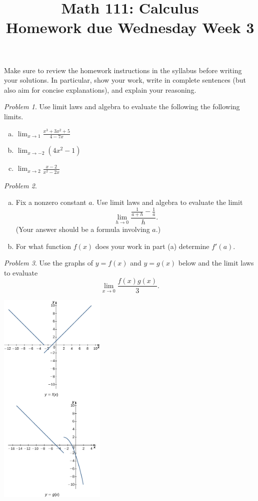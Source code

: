 \documentclass[11pt,twoside]{amsart}
\title{Math 111: Calculus\\ Homework due Wednesday Week 3}
\theoremstyle{plain}
\theoremstyle{remark}
\newtheorem{prob}{Problem}
\theoremstyle{definition}
\theoremstyle{definition}
\begin{document}
\maketitle

\noindent Make sure to review the homework instructions in the syllabus before writing your solutions. In particular, show your work, write in complete sentences (but also aim for concise explanations), and explain your reasoning.

\begin{prob}
Use limit laws and algebra to evaluate the following the following limits.
\begin{enumerate}[(a)]
\item $\lim_{x\to 1}\frac{x^3+3x^2+5}{4-7x}$
\item $\lim_{x\to -2}(4x^2-1)$
\item $\lim_{x\to 2}\frac{x-2}{x^2-2x}$
\end{enumerate}
\end{prob}

\begin{prob}
\begin{enumerate}[(a)]
\item Fix a nonzero constant $a$. Use limit laws and algebra to evaluate the limit
\[
  \lim_{h\to 0}\frac{\frac{1}{a+h}-\frac{1}{a}}{h}.
\]
(Your answer should be a formula involving $a$.)
\item For what function $f(x)$ does your work in part (a) determine $f'(a)$.
\end{enumerate}
\end{prob}

\begin{prob}
Use the graphs of $y=f(x)$ and $y=g(x)$ below and the limit laws to evaluate
\[
  \lim_{x\to 0}\frac{f(x)g(x)}{3}.
\]
\bigskip
\begin{center}
\includegraphics[width=2in]{week03f.jpeg}
\end{center}
\end{prob}
\end{document}
